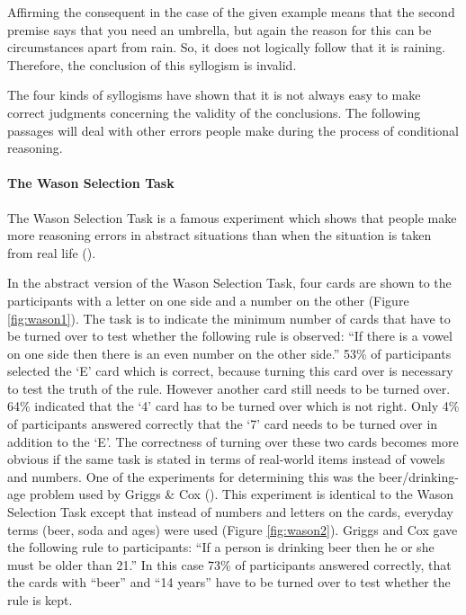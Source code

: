 \documentclass[
]{krantz}
\begin{document}
Affirming the consequent in the case of the given example means that the second premise says that you need an umbrella, but again the reason for this can be circumstances apart from rain. So, it does not logically follow that it is raining. Therefore, the conclusion of this syllogism is invalid.

The four kinds of syllogisms have shown that it is not always easy to make correct judgments concerning the validity of the conclusions. The following passages will deal with other errors people make during the process of conditional reasoning.

\paragraph*{The Wason Selection Task}\label{the-wason-selection-task}

The Wason Selection Task is a famous experiment which shows that people make more reasoning errors in abstract situations than when the situation is taken from real life ().

In the abstract version of the Wason Selection Task, four cards are shown to the participants with a letter on one side and a number on the other (Figure \ref{fig:wason1}). The task is to indicate the minimum number of cards that have to be turned over to test whether the following rule is observed: ``If there is a vowel on one side then there is an even number on the other side.'' 53\% of participants selected the `E' card which is correct, because turning this card over is necessary to test the truth of the rule. However another card still needs to be turned over. 64\% indicated that the `4' card has to be turned over which is not right. Only 4\% of participants answered correctly that the `7' card needs to be turned over in addition to the `E'. The correctness of turning over these two cards becomes more obvious if the same task is stated in terms of real-world items instead of vowels and numbers. One of the experiments for determining this was the beer/drinking-age problem used by Griggs \& Cox (). This experiment is identical to the Wason Selection Task except that instead of numbers and letters on the cards, everyday terms (beer, soda and ages) were used (Figure \ref{fig:wason2}). Griggs and Cox gave the following rule to participants: ``If a person is drinking beer then he or she must be older than 21.'' In this case 73\% of participants answered correctly, that the cards with ``beer'' and ``14 years'' have to be turned over to test whether the rule is kept.
\end{document}
